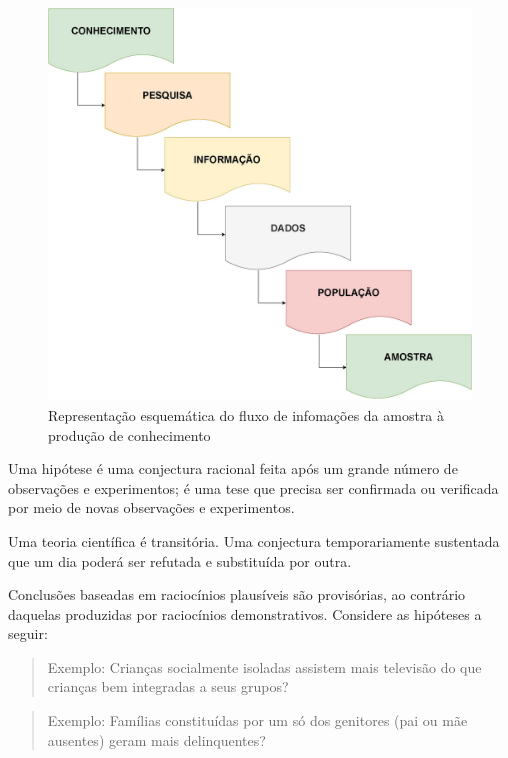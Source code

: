 \documentclass[
]{book}
\begin{document}
\hfill\break

\begin{figure}

{\centering \includegraphics[width=0.8\linewidth]{images7/esquema} 

}

\caption{Representação esquemática do fluxo de infomações da amostra à produção de conhecimento }\label{fig:fig01}
\end{figure}

\hfill\break

Uma hipótese é uma conjectura racional feita após um grande número de observações e experimentos; é uma tese que precisa ser confirmada ou verificada por meio de novas observações e experimentos.

\hfill\break

Uma teoria científica é transitória. Uma conjectura temporariamente sustentada que um dia poderá ser refutada e substituída por outra.

\hfill\break

Conclusões baseadas em raciocínios plausíveis são provisórias, ao contrário daquelas produzidas por raciocínios demonstrativos. Considere as hipóteses a seguir:

\hfill\break

\begin{quote}
Exemplo: Crianças socialmente isoladas assistem mais televisão do que crianças bem integradas a seus grupos?
\end{quote}

\begin{quote}
Exemplo: Famílias constituídas por um só dos genitores (pai ou mãe ausentes) geram mais delinquentes?
\end{quote}
\end{document}
